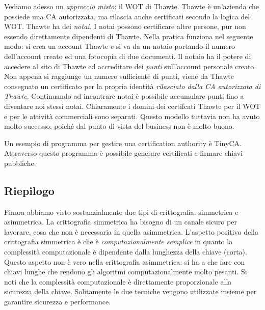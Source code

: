 Vediamo adesso un \textit{approccio misto}: il WOT di Thawte. Thawte è un'azienda che possiede una CA autorizzata, ma rilascia anche certificati secondo la logica del WOT. Thawte ha dei \textit{notai}. I notai possono certificare altre persone, pur non essendo direttamente dipendenti di Thawte. Nella pratica funziona nel seguente modo: si crea un account Thawte e si va da un notaio portando il numero dell'account creato ed una fotocopia di due documenti. Il notaio ha il potere di accedere al sito di Thawte ed accreditare dei \textit{punti} sull'account personale creato. Non appena si raggiunge un numero sufficiente di punti, viene da Thawte consegnato un certificato per la propria identità \textit{rilasciato dalla CA autorizzata di Thawte}. Continuando ad incontrare notai è possibile accumulare punti fino a diventare noi stessi notai. Chiaramente i domini dei certifcati Thawte per il WOT e per le attività commerciali sono separati. Questo modello tuttavia non ha avuto molto successo, poiché dal punto di vista del business non è molto buono.

Un esempio di programma per gestire una certification authority è TinyCA. Attraverso questo programma è possibile generare certificati e firmare chiavi pubbliche.

\subsection*{Riepilogo}
Finora abbiamo visto sostanzialmente due tipi di crittografia: simmetrica e asimmetrica. La crittografia simmetrica ha bisogno di un canale sicuro per lavorare, cosa che non è necessaria in quella asimmetrica. L'aspetto positivo della crittografia simmetrica è che è \textit{computazionalmente semplice} in quanto la complessità computazionale è dipendente dalla lunghezza della chiave (corta). Questo aspetto non è vero nella crittografia asimmetrica: si ha a che fare con chiavi lunghe che rendono gli algoritmi computazionalmente molto pesanti. Si noti che la complessità computazionale è direttamente proporzionale alla sicurezza della chiave. Solitamente le due tecniche vengono utilizzate insieme per garantire sicurezza e performance.

